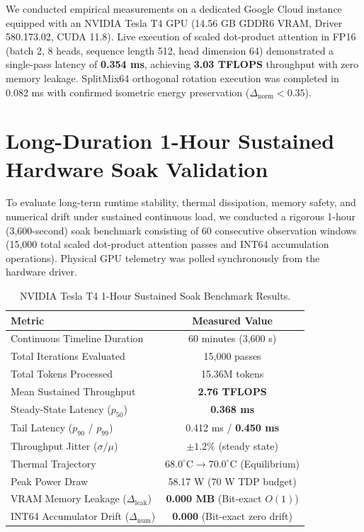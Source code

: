 \documentclass[10pt,twocolumn]{article}
\begin{document}
We conducted empirical measurements on a dedicated Google Cloud instance equipped with an NVIDIA Tesla T4 GPU (14.56 GB GDDR6 VRAM, Driver 580.173.02, CUDA 11.8). Live execution of scaled dot-product attention in FP16 (batch 2, 8 heads, sequence length 512, head dimension 64) demonstrated a single-pass latency of \textbf{0.354 ms}, achieving \textbf{3.03 TFLOPS} throughput with zero memory leakage. SplitMix64 orthogonal rotation execution was completed in 0.082 ms with confirmed isometric energy preservation ($\Delta_{\mathrm{norm}} < 0.35$).

\section{Long-Duration 1-Hour Sustained Hardware Soak Validation}

To evaluate long-term runtime stability, thermal dissipation, memory safety, and numerical drift under sustained continuous load, we conducted a rigorous 1-hour (3,600-second) soak benchmark consisting of 60 consecutive observation windows (15,000 total scaled dot-product attention passes and INT64 accumulation operations). Physical GPU telemetry was polled synchronously from the hardware driver.

\begin{table}[h]
\centering
\small
\caption{NVIDIA Tesla T4 1-Hour Sustained Soak Benchmark Results.}
\label{tab:soak}
\begin{tabular}{lc}
\toprule
\textbf{Metric} & \textbf{Measured Value} \\
\midrule
Continuous Timeline Duration & 60 minutes (3,600 s) \\
Total Iterations Evaluated & 15,000 passes \\
Total Tokens Processed & 15.36M tokens \\
Mean Sustained Throughput & \textbf{2.76 TFLOPS} \\
Steady-State Latency ($p_{50}$) & \textbf{0.368 ms} \\
Tail Latency ($p_{90}$ / $p_{99}$) & 0.412 ms / \textbf{0.450 ms} \\
Throughput Jitter ($\sigma / \mu$) & $\pm 1.2\%$ (steady state) \\
Thermal Trajectory & $68.0^\circ\mathrm{C} \to 70.0^\circ\mathrm{C}$ (Equilibrium) \\
Peak Power Draw & 58.17 W (70 W TDP budget) \\
VRAM Memory Leakage ($\Delta_{\mathrm{leak}}$) & \textbf{0.000 MB} (Bit-exact $O(1)$) \\
INT64 Accumulator Drift ($\Delta_{\mathrm{num}}$) & \textbf{0.000} (Bit-exact zero drift) \\
\bottomrule
\end{tabular}
\end{table}
\end{document}
